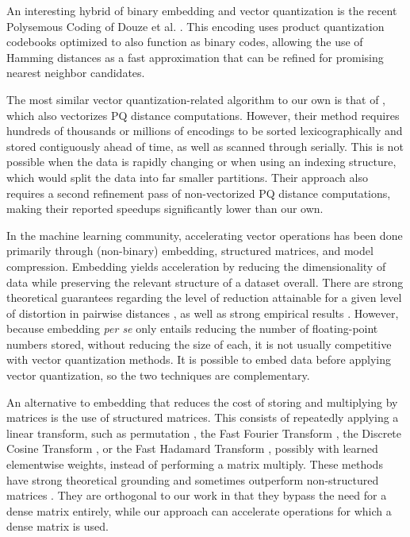 An interesting hybrid of binary embedding and vector quantization is the recent Polysemous Coding of Douze et al. \cite{polysemous}. This encoding uses product quantization codebooks optimized to also function as binary codes, allowing the use of Hamming distances as a fast approximation that can be refined for promising nearest neighbor candidates. %

The most similar vector quantization-related algorithm to our own is that of \cite{simdpq}, which also vectorizes PQ distance computations. However, their method requires hundreds of thousands or millions of encodings to be sorted lexicographically and stored contiguously ahead of time, as well as scanned through serially. This is not possible when the data is rapidly changing or when using an indexing structure, which would split the data into far smaller partitions. Their approach also requires a second refinement pass of non-vectorized PQ distance computations, making their reported speedups significantly lower than our own.

In the machine learning community, accelerating vector operations has been done primarily through (non-binary) embedding, structured matrices, and model compression. Embedding yields acceleration by reducing the dimensionality of data while preserving the relevant structure of a dataset overall. There are strong theoretical guarantees regarding the level of reduction attainable for a given level of distortion in pairwise distances \cite{jl, fastJL, jlIsTight}, as well as strong empirical results \cite{superBitLSH, compressiveMining}. However, because embedding \textit{per se} only entails reducing the number of floating-point numbers stored, without reducing the size of each, it is not usually competitive with vector quantization methods. It is possible to embed data before applying vector quantization, so the two techniques are complementary.

An alternative to embedding that reduces the cost of storing and multiplying by matrices is the use of structured matrices. This consists of repeatedly applying a linear transform, such as permutation \cite{adaptiveFastfood}, the Fast Fourier Transform \cite{orthogonalRandomFeatures}, the Discrete Cosine Transform \cite{acdc}, or the Fast Hadamard Transform \cite{crosspolytopeLSH, structuredSpinners}, possibly with learned elementwise weights, instead of performing a matrix multiply. These methods have strong theoretical grounding \cite{structuredSpinners} and sometimes outperform non-structured matrices \cite{adaptiveFastfood}. They are orthogonal to our work in that they bypass the need for a dense matrix entirely, while our approach can accelerate operations for which a dense matrix is used.

